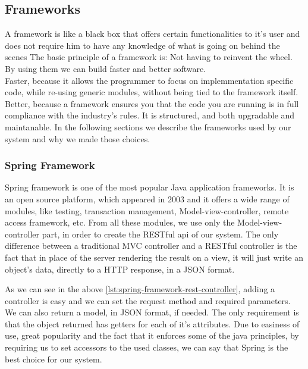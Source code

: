 \subsection{Frameworks}
\label{sec:frameworks}
A framework is like a black box that offers certain functionalities to it's user and does not require him to have any knowledge of what is going on behind the scenes
The basic principle of a framework is: Not having to reinvent the wheel. By using them we can build faster and better software.
\\ Faster, because it allows the programmer to focus on implemmentation specific code, while re-using generic modules, without being tied to the framework itself.
\\ Better, because a framework ensures you that the code you are running is in full compliance with the industry's rules. It is structured, and both upgradable and maintanable.
In the following sections we describe the frameworks used by our system and why we made those choices.

\subsubsection{Spring Framework}
\label{sec:frameworks-spring-framework}
Spring framework is one of the most popular Java application frameworks. It is an open source platform, which appeared in 2003 and it offers a wide range of modules, like testing, transaction management, Model-view-controller, remote access framework, etc. 
From all these modules, we use only the Model-view-controller part, in order to create the RESTful api of our system.
The only difference between a traditional MVC controller and a RESTful controller is the fact that in place of the server rendering the result on a view, it will just write an object's data, directly to a HTTP response, in a JSON format.
\lstset{caption=Spring framework REST controller code, label=lst:spring-framework-rest-controller}

As we can see in the above \autoref{lst:spring-framework-rest-controller}, adding a controller is easy and we can set the request method and required parameters.
We can also return a model, in JSON format, if needed. The only requirement is that the object returned has getters for each of it's attributes.
Due to easiness of use, great popularity and the fact that it enforces some of the java principles, by requiring us to set accessors to the used classes, we can say that Spring is the best choice for our system. 

